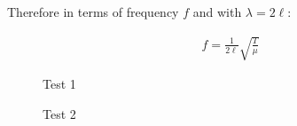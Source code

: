 \documentclass[%
 reprint,
 amsmath,amssymb,
 aps,
]{revtex4-1}
\begin{document}
Therefore in terms of frequency $f$ and with $\lambda = 2 \ell$:

\begin{align} \label{duh}
f = \frac{1}{2\ell} \sqrt{\frac{T}{\mu}}
\end{align}

\begin{figure}[h]
\caption{Test 1}
\label{Test1}
\end{figure}

\begin{figure}[h]
\caption{Test 2}
\label{Test2}
\end{figure}
\end{document}
